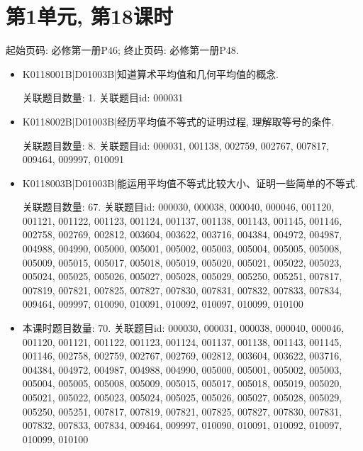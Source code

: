 \section*{第1单元, 第18课时}
起始页码: 必修第一册P46; 终止页码: 必修第一册P48.
\begin{itemize}
\item K0118001B|D01003B|知道算术平均值和几何平均值的概念.

关联题目数量: 1. 关联题目id: 000031

\item K0118002B|D01003B|经历平均值不等式的证明过程, 理解取等号的条件.

关联题目数量: 8. 关联题目id: 000031, 001138, 002759, 002767, 007817, 009464, 009997, 010091

\item K0118003B|D01003B|能运用平均值不等式比较大小、证明一些简单的不等式.

关联题目数量: 67. 关联题目id: 000030, 000038, 000040, 000046, 001120, 001121, 001122, 001123, 001124, 001137, 001138, 001143, 001145, 001146, 002758, 002769, 002812, 003604, 003622, 003716, 004384, 004972, 004987, 004988, 004990, 005000, 005001, 005002, 005003, 005004, 005005, 005008, 005009, 005015, 005017, 005018, 005019, 005020, 005021, 005022, 005023, 005024, 005025, 005026, 005027, 005028, 005029, 005250, 005251, 007817, 007819, 007821, 007825, 007827, 007830, 007831, 007832, 007833, 007834, 009464, 009997, 010090, 010091, 010092, 010097, 010099, 010100

\item 本课时题目数量: 70. 关联题目id: 000030, 000031, 000038, 000040, 000046, 001120, 001121, 001122, 001123, 001124, 001137, 001138, 001143, 001145, 001146, 002758, 002759, 002767, 002769, 002812, 003604, 003622, 003716, 004384, 004972, 004987, 004988, 004990, 005000, 005001, 005002, 005003, 005004, 005005, 005008, 005009, 005015, 005017, 005018, 005019, 005020, 005021, 005022, 005023, 005024, 005025, 005026, 005027, 005028, 005029, 005250, 005251, 007817, 007819, 007821, 007825, 007827, 007830, 007831, 007832, 007833, 007834, 009464, 009997, 010090, 010091, 010092, 010097, 010099, 010100

\end{itemize}

